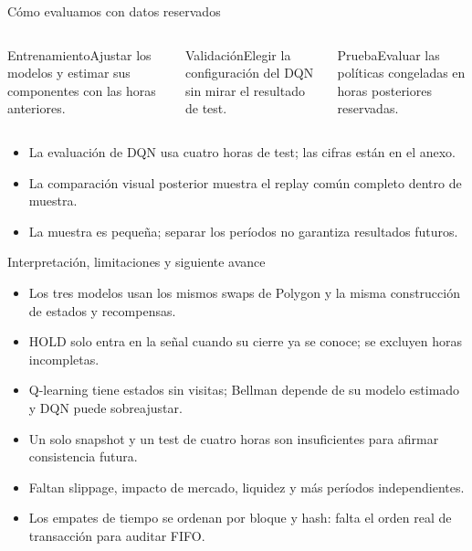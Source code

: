 \documentclass[10pt,aspectratio=169]{beamer}
\begin{document}
\begin{frame}{Cómo evaluamos con datos reservados}
\begin{columns}[T,onlytextwidth]
\begin{block}{Entrenamiento}\small Ajustar los modelos y estimar sus componentes con las horas anteriores.\end{block}
\begin{block}{Validación}\small Elegir la configuración del DQN sin mirar el resultado de test.\end{block}
\begin{block}{Prueba}\small Evaluar las políticas congeladas en horas posteriores reservadas.\end{block}
\end{columns}
\vspace{.8em}
\begin{itemize}\small
\item La evaluación de DQN usa cuatro horas de test; las cifras están en el anexo.
\item La comparación visual posterior muestra el replay común completo dentro de muestra.
\item La muestra es pequeña; separar los períodos no garantiza resultados futuros.
\end{itemize}
\end{frame}

\begin{frame}{Interpretación, limitaciones y siguiente avance}
\begin{itemize}
\item Los tres modelos usan los mismos swaps de Polygon y la misma construcción de estados y recompensas.
\item HOLD solo entra en la señal cuando su cierre ya se conoce; se excluyen horas incompletas.
\item Q-learning tiene estados sin visitas; Bellman depende de su modelo estimado y DQN puede sobreajustar.
\item Un solo snapshot y un test de cuatro horas son insuficientes para afirmar consistencia futura.
\item Faltan slippage, impacto de mercado, liquidez y más períodos independientes.
\item Los empates de tiempo se ordenan por bloque y hash: falta el orden real de transacción para auditar FIFO.
\end{itemize}
\end{frame}
\end{document}
